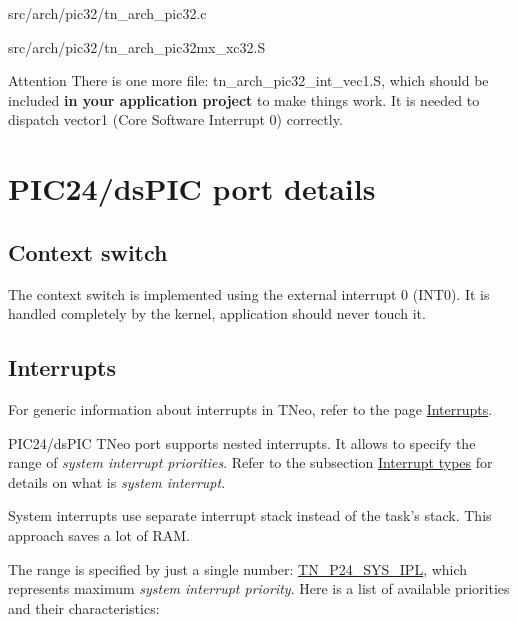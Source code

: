 \begin{DoxyItemize}
\item {\ttfamily src/arch/pic32/tn\+\_\+arch\+\_\+pic32.\+c}
\item {\ttfamily src/arch/pic32/tn\+\_\+arch\+\_\+pic32mx\+\_\+xc32.\+S}
\end{DoxyItemize}

\begin{DoxyAttention}{Attention}
There is one more file\+: {\ttfamily tn\+\_\+arch\+\_\+pic32\+\_\+int\+\_\+vec1.\+S}, which should be included {\bfseries in your application project} to make things work. It is needed to dispatch vector1 (Core Software Interrupt 0) correctly.
\end{DoxyAttention}
\hypertarget{arch_specific_pic24_details}{}\section{P\+I\+C24/ds\+P\+I\+C port details}\label{arch_specific_pic24_details}
\hypertarget{arch_specific_pic24_context_switch}{}\subsection{Context switch}\label{arch_specific_pic24_context_switch}
The context switch is implemented using the external interrupt 0 ({\ttfamily I\+N\+T0}). It is handled completely by the kernel, application should never touch it.\hypertarget{arch_specific_pic24_interrupts}{}\subsection{Interrupts}\label{arch_specific_pic24_interrupts}
For generic information about interrupts in T\+Neo, refer to the page \hyperlink{interrupts}{Interrupts}.

P\+I\+C24/ds\+P\+I\+C T\+Neo port supports nested interrupts. It allows to specify the range of {\itshape system interrupt priorities}. Refer to the subsection \hyperlink{interrupts_interrupt_types}{Interrupt types} for details on what is {\itshape system interrupt}.

System interrupts use separate interrupt stack instead of the task's stack. This approach saves a lot of R\+A\+M.

The range is specified by just a single number\+: {\ttfamily \hyperlink{tn__cfg__default_8h_a4feb7eb34fc2f175167b7496b63c398a}{T\+N\+\_\+\+P24\+\_\+\+S\+Y\+S\+\_\+\+I\+P\+L}}, which represents maximum {\itshape system interrupt priority}. Here is a list of available priorities and their characteristics\+:


